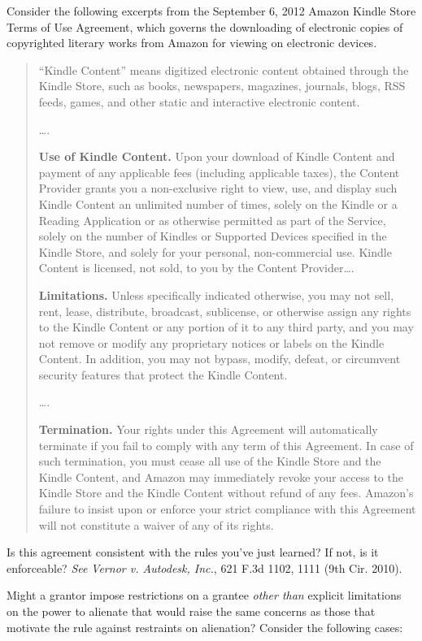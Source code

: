 \item Consider the following excerpts from the September 6, 2012 Amazon Kindle
Store Terms of Use Agreement,
which governs the downloading of electronic copies of copyrighted literary
works from Amazon for viewing on electronic devices. 
\begin{quotation}
``Kindle Content'' means digitized electronic content obtained through the
Kindle Store, such as books, newspapers, magazines, journals, blogs, RSS feeds,
games, and other static and interactive electronic content. 

\dots.

\textbf{Use of Kindle Content.} Upon your download of Kindle Content
and payment of any applicable fees (including applicable taxes), the Content
Provider grants you a non-exclusive right to view, use, and display such Kindle
Content an unlimited number of times, solely on the Kindle or a Reading
Application or as otherwise permitted as part of the Service, solely on the
number of Kindles or Supported Devices specified in the Kindle Store, and
solely for your personal, non-commercial use. Kindle Content is licensed, not
sold, to you by the Content Provider\dots.

\textbf{Limitations.} Unless specifically indicated otherwise, you may
not sell, rent, lease, distribute, broadcast, sublicense, or otherwise assign
any rights to the Kindle Content or any portion of it to any third party, and
you may not remove or modify any proprietary notices or labels on the Kindle
Content. In addition, you may not bypass, modify, defeat, or circumvent
security features that protect the Kindle Content. 

\dots.

\textbf{Termination.} Your rights under this Agreement will
automatically terminate if you fail to comply with any term of this Agreement.
In case of such termination, you must cease all use of the Kindle Store and the
Kindle Content, and Amazon may immediately revoke your access to the Kindle
Store and the Kindle Content without refund of any fees. Amazon's failure to
insist upon or enforce your strict compliance with this Agreement will not
constitute a waiver of any of its rights.
\end{quotation}
Is this agreement consistent with the rules you've just learned? If not, is it
enforceable? \textit{See} \emph{Vernor v. Autodesk, Inc.}, 621 F.3d 1102, 1111
(9th Cir. 2010).


\item Might a grantor impose restrictions on a grantee \textit{other than}
explicit limitations on the power to alienate that would raise the same
concerns as those that motivate the rule against restraints on alienation?
Consider the following cases:



